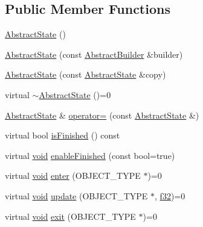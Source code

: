 \subsection*{Public Member Functions}
\begin{DoxyCompactItemize}
\item 
\mbox{\hyperlink{classnjli_1_1_abstract_state_a22638b01fb13e4e7920071d1c3935622}{Abstract\+State}} ()
\item 
\mbox{\hyperlink{classnjli_1_1_abstract_state_ad576862504904cabe58e872e316916b6}{Abstract\+State}} (const \mbox{\hyperlink{classnjli_1_1_abstract_builder}{Abstract\+Builder}} \&builder)
\item 
\mbox{\hyperlink{classnjli_1_1_abstract_state_a0b92c7b010d060a03395ac5874c77019}{Abstract\+State}} (const \mbox{\hyperlink{classnjli_1_1_abstract_state}{Abstract\+State}} \&copy)
\item 
virtual \mbox{\hyperlink{classnjli_1_1_abstract_state_a7a85afddf6feb5908199ac3678225c5b}{$\sim$\+Abstract\+State}} ()=0
\item 
\mbox{\hyperlink{classnjli_1_1_abstract_state}{Abstract\+State}} \& \mbox{\hyperlink{classnjli_1_1_abstract_state_a70a074e9ffcc4ad76236052a4f079dc6}{operator=}} (const \mbox{\hyperlink{classnjli_1_1_abstract_state}{Abstract\+State}} \&)
\item 
virtual bool \mbox{\hyperlink{classnjli_1_1_abstract_state_a4c7007210237496fbe169ba114c3750d}{is\+Finished}} () const
\item 
virtual \mbox{\hyperlink{_thread_8h_af1e856da2e658414cb2456cb6f7ebc66}{void}} \mbox{\hyperlink{classnjli_1_1_abstract_state_aa4e66d0016cd5c43dc3a485eaf558174}{enable\+Finished}} (const bool=true)
\item 
virtual \mbox{\hyperlink{_thread_8h_af1e856da2e658414cb2456cb6f7ebc66}{void}} \mbox{\hyperlink{classnjli_1_1_abstract_state_ae10e437370dcfc3261ec0b9f350f16d8}{enter}} (O\+B\+J\+E\+C\+T\+\_\+\+T\+Y\+PE $\ast$)=0
\item 
virtual \mbox{\hyperlink{_thread_8h_af1e856da2e658414cb2456cb6f7ebc66}{void}} \mbox{\hyperlink{classnjli_1_1_abstract_state_aa1d0341a1b1bd83f9b722488680537ad}{update}} (O\+B\+J\+E\+C\+T\+\_\+\+T\+Y\+PE $\ast$, \mbox{\hyperlink{_util_8h_a5f6906312a689f27d70e9d086649d3fd}{f32}})=0
\item 
virtual \mbox{\hyperlink{_thread_8h_af1e856da2e658414cb2456cb6f7ebc66}{void}} \mbox{\hyperlink{classnjli_1_1_abstract_state_a75207a4c62f813d8d84168024a30c60a}{exit}} (O\+B\+J\+E\+C\+T\+\_\+\+T\+Y\+PE $\ast$)=0
\item 

\end{DoxyCompactItemize}

